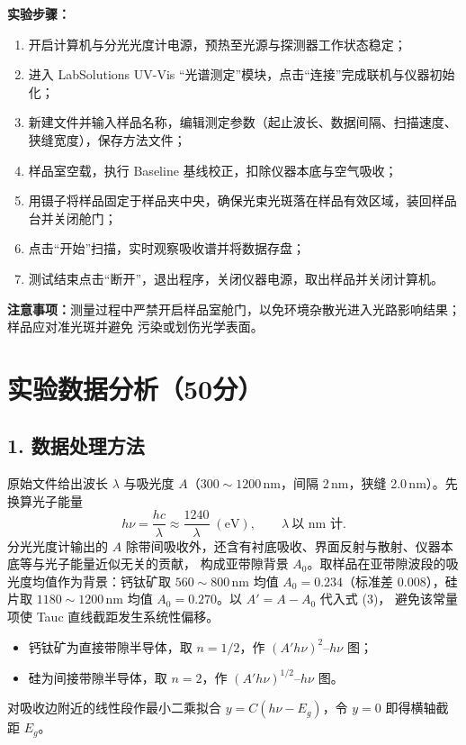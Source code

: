 \documentclass[12pt,a4paper]{ctexart}
\begin{document}
\textbf{实验步骤：}
\begin{enumerate}
  \item 开启计算机与分光光度计电源，预热至光源与探测器工作状态稳定；
  \item 进入 LabSolutions UV-Vis ``光谱测定''模块，点击``连接''完成联机与仪器初始化；
  \item 新建文件并输入样品名称，编辑测定参数（起止波长、数据间隔、扫描速度、狭缝宽度），保存方法文件；
  \item 样品室空载，执行 Baseline 基线校正，扣除仪器本底与空气吸收；
  \item 用镊子将样品固定于样品夹中央，确保光束光斑落在样品有效区域，装回样品台并关闭舱门；
  \item 点击``开始''扫描，实时观察吸收谱并将数据存盘；
  \item 测试结束点击``断开''，退出程序，关闭仪器电源，取出样品并关闭计算机。
\end{enumerate}

\textbf{注意事项：}测量过程中严禁开启样品室舱门，以免环境杂散光进入光路影响结果；样品应对准光斑并避免
污染或划伤光学表面。


\section*{实验数据分析（50分）}

\subsection*{1. 数据处理方法}

原始文件给出波长 $\lambda$ 与吸光度 $A$（$300\sim1200$\,nm，间隔 2\,nm，狭缝 2.0\,nm）。先换算光子能量
\begin{equation}
h\nu=\frac{hc}{\lambda}\approx\frac{1240}{\lambda}\;(\mathrm{eV}),\qquad \lambda\ \text{以 nm 计}.
\end{equation}
分光光度计输出的 $A$ 除带间吸收外，还含有衬底吸收、界面反射与散射、仪器本底等与光子能量近似无关的贡献，
构成亚带隙背景 $A_0$。取样品在亚带隙波段的吸光度均值作为背景：钙钛矿取 $560\sim800$\,nm 均值
$A_0=0.234$（标准差 0.008），硅片取 $1180\sim1200$\,nm 均值 $A_0=0.270$。以 $A'=A-A_0$ 代入式 (3)，
避免该常量项使 Tauc 直线截距发生系统性偏移。
\begin{itemize}
  \item 钙钛矿为直接带隙半导体，取 $n=1/2$，作 $(A'h\nu)^2$--$h\nu$ 图；
  \item 硅为间接带隙半导体，取 $n=2$，作 $(A'h\nu)^{1/2}$--$h\nu$ 图。
\end{itemize}
对吸收边附近的线性段作最小二乘拟合 $y=C(h\nu-E_g)$，令 $y=0$ 即得横轴截距 $E_g$。
\end{document}
